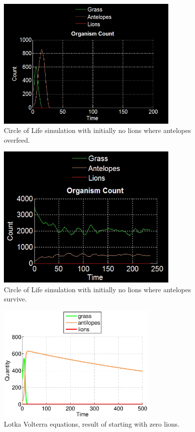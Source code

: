\documentclass[11pt]{article}
\begin{document}
\begin{figure}
\centering
\includegraphics[width=0.8\textwidth]{noLionsOnlyCount.png}
\caption{Circle of Life simulation with initially no lions where antelopes overfeed.}
\label{fig:noLions}
\end{figure}
\begin{figure}
\centering
\includegraphics[width=0.8\textwidth]{noLionsOnlyCountSurvive.png}
\caption{Circle of Life simulation with initially no lions where antelopes survive.}
\label{fig:noLionsSurv}
\end{figure}

\begin{figure}
\centering
\includegraphics[width=0.7\textwidth]{LotkaVolterraNoLions.eps}
\caption{Lotka Volterra equations, result of starting with zero lions.}
\label{fig:LotkaNoLions}
\end{figure}
\end{document}
